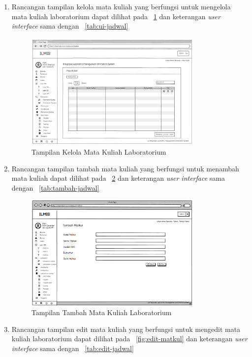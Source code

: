 \begin{enumerate}
	\item Rancangan tampilan kelola mata kuliah yang berfungsi untuk mengelola mata kuliah laboratorium dapat dilihat pada \pic~\ref{fig:matkul} dan keterangan \textit{user interface} sama dengan \tab~\ref{tab:ui-jadwal}
	      \begin{figure}
		      \centering
		      \includegraphics[width=0.82\textwidth]{konten/gambar/user interface/ui-matkul.png}
		      \caption{Tampilan Kelola Mata Kuliah Laboratorium}
		      \label{fig:matkul}
	      \end{figure}
	\item Rancangan tampilan tambah mata kuliah yang berfungsi untuk menambah mata kuliah dapat dilihat pada \pic~\ref{fig:tambah-matkul} dan keterangan \textit{user interface} sama dengan \tab~\ref{tab:tambah-jadwal}
	      \begin{figure}
		      \centering
		      \includegraphics[width=0.82\textwidth]{konten/gambar/user interface/tambah-matkul.png}
		      \caption{Tampilan Tambah Mata Kuliah Laboratorium}
		      \label{fig:tambah-matkul}
	      \end{figure}
	\item Rancangan tampilan edit mata kuliah yang berfungsi untuk mengedit mata kuliah laboratorium dapat dilihat pada \pic~\ref{fig:edit-matkul} dan keterangan \textit{user interface} sama dengan \tab~\ref{tab:edit-jadwal}

\end{enumerate}
